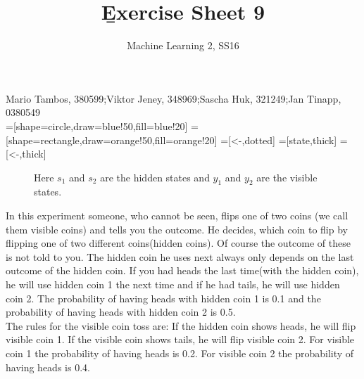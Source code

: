 \documentclass[a4paper]{article}
\newcommand{\1}{\mathds{1}}
\begin{document}
\title{\b{Exercise Sheet 9}}
\author{Machine Learning 2, SS16}

\maketitle

Mario Tambos, 380599;\quad Viktor Jeney, 348969;\quad Sascha Huk, 321249;\quad Jan Tinapp, 0380549\\

=[shape=circle,draw=blue!50,fill=blue!20]
=[shape=rectangle,draw=orange!50,fill=orange!20]
=[<-,dotted]
=[state,thick]
=[<-,thick]

\begin{figure}[htbp]
	\begin{center}
	\end{center}
	\caption{Here $s_1$ and $s_2$ are the hidden states and $y_1$ and $y_2$ are the visible states.}
\end{figure}



In this experiment someone, who cannot be seen, flips one of two coins (we call them visible coins) and tells you the outcome. He decides, which coin to flip by flipping one of two different coins(hidden coins). Of course the outcome of these is not told to you. The hidden coin he uses next always only depends on the last outcome of the hidden coin. If you had heads the last time(with the hidden coin), he will use hidden coin 1 the next time and if he had tails, he will use hidden coin 2. The probability of having heads with hidden coin 1 is 0.1 and the probability of having heads with hidden coin 2 is 0.5.\\
The rules for the visible coin toss are: If the hidden coin shows heads, he will flip visible coin 1. If the visible coin shows tails, he will flip visible coin 2. For visible coin 1 the probability of having heads is 0.2. For visible coin 2 the probability of having heads is 0.4.\\
\end{document}
